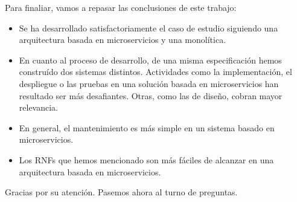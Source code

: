 \documentclass[11pt,a4paper]{article}
\begin{document}
Para finaliar, vamos a repasar las conclusiones de este trabajo:

\begin{itemize}

\item Se ha desarrollado satisfactoriamente el caso de estudio siguiendo una arquitectura basada en microservicios y una monolítica.

\item En cuanto al proceso de desarrollo, de una misma especificación hemos construído dos sistemas distintos. Actividades como la implementación, el despliegue o las pruebas en una solución basada en microservicios han resultado ser más desafiantes. Otras, como las de diseño, cobran mayor relevancia.

\item En general, el mantenimiento es más simple en un sistema basado en microservicios.

\item Los RNFs que hemos mencionado son más fáciles de alcanzar en una arquitectura basada en microservicios.

\end{itemize}

Gracias por su atención. Pasemos ahora al turno de preguntas.
\end{document}
